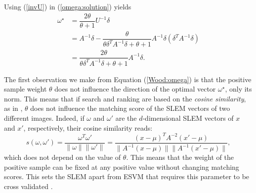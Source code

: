 Using (\ref{invU}) in (\ref{omega:solution}) yields
\begin{equation}
\begin{split}
\omega^\star &= \dfrac{2\theta}{\theta+1}U^{-1}\delta \\
&= A^{-1}\delta - \dfrac{\theta}{\theta\delta^TA^{-1}\delta+ \theta+1} A^{-1}\delta (\delta^TA^{-1}\delta)\\
&= \dfrac{2\theta}{\theta\delta^TA^{-1}\delta+ \theta+1} A^{-1}\delta.\label{Wood:omega}
\end{split}
\end{equation}

The first observation we make from Equation (\ref{Wood:omega}) is that the positive sample weight $\theta$ does not influence the direction of the optimal vector $\omega^\star$, only its norm. This means that if search and ranking are based on the \textit{cosine similarity}, as in \cite{ZePe15}, $\theta$ does not influence the matching score of the SLEM vectors of two different images.
Indeed, if $\omega$ and $\omega'$ are the $d$-dimensional SLEM vectors of $x$ and $x'$, respectively, their cosine similarity reads:
\begin{equation}
s(\omega, \omega') = \dfrac{\omega^T \omega'}{\|\omega\| \|\omega'\|} = \frac{(x-\mu)^TA^{-2}(x'-\mu)}{\|A^{-1}(x-\mu)\|\|A^{-1}(x'-\mu)\|},\label{match:score}
\end{equation}
which does not depend on the value of $\theta$. This means that the weight of the positive sample can be fixed at any positive value without changing matching scores. This sets the SLEM apart from ESVM that requires this parameter to be cross validated \cite{Efros11,ZePe15}.


 
